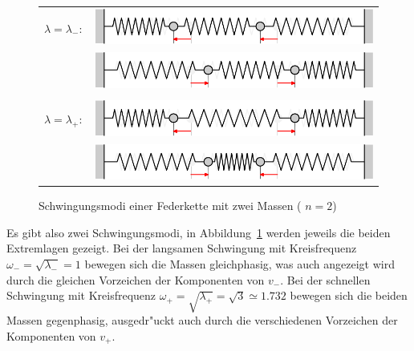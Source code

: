 \begin{figure}
\begin{center}
\begin{tabular}{ll}
$\lambda=\lambda_-:$&%
\includegraphics{images/e-4}\\%
&\includegraphics{images/e-5}\\%
\\
$\lambda=\lambda_+:$&%
\includegraphics{images/e-2}\\%
&\includegraphics{images/e-3}%
\end{tabular}
\end{center}
\caption{Schwingungsmodi einer Federkette mit zwei Massen ( $n=2$)\label{n2modi}}
\end{figure}%
Es gibt also zwei Schwingungsmodi, in
Abbildung~\ref{n2modi} werden jeweils die beiden Extremlagen 
gezeigt.
Bei der langsamen Schwingung mit Kreisfrequenz
$\omega_-=\sqrt{\lambda_-}=1$ bewegen sich die Massen gleichphasig,
was auch angezeigt wird durch die gleichen Vorzeichen
der Komponenten von $v_-$.
Bei der schnellen Schwingung mit Kreisfrequenz
$\omega_+=\sqrt{\lambda_+}=\sqrt{3}\simeq 1.732$ bewegen sich die 
beiden Massen gegenphasig, ausgedr"uckt auch durch
die verschiedenen Vorzeichen der Komponenten von $v_+$.


